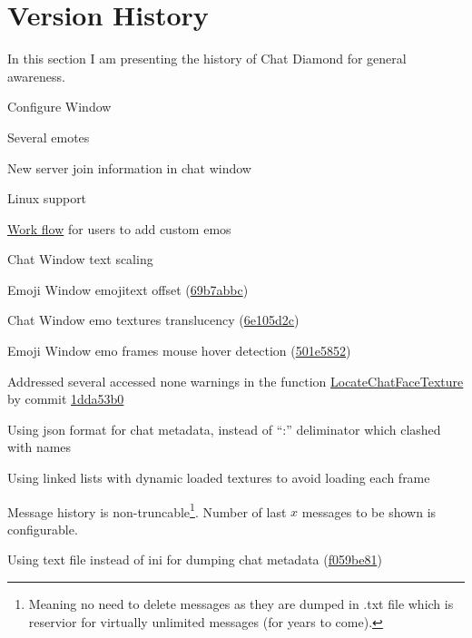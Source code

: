 \documentclass{article}
\theoremstyle{definition}
\begin{document}
\section{Version History}
In this section I am presenting the history of Chat Diamond for general awareness.
\begin{changelog}[author=The\_Cowboy, sectioncmd=\section*]
\begin{version}[v=0.8, date=2023-12-10]
  \added
    \item Configure Window
    \item Several emotes
    \item New server join information in chat window
    \item Linux support
    \item \href{https://github.com/ravimohan1991/ChatDiamond/wiki/Adding-an-Emote-in-Chat-Diamond}{Work flow} for users to add custom emos
  \fixed
    \item Chat Window text scaling
    \item Emoji Window emojitext offset (\href{https://github.com/ravimohan1991/ChatDiamond/commit/69b7abbce0617ae1c2de0660379984852df9c76d}{69b7abbc})
    \item Chat Window emo textures translucency (\href{https://github.com/ravimohan1991/ChatDiamond/commit/6e105d2cce5db1380c27df546e604d0f306eccd4}{6e105d2c})
    \item Emoji Window emo frames mouse hover detection (\href{https://github.com/ravimohan1991/ChatDiamond/commit/501e585250a6553ca95ca9b9d5e0ad25b1e645b5}{501e5852})
    \item Addressed several accessed none warnings in the function \href{https://github.com/ravimohan1991/ChatDiamond/blob/1dda53b01b493a2ef8be156966b3230758211254/Classes/CDUTChatTextTextureAnimEmoteArea.uc#L890}{LocateChatFaceTexture} by commit \href{https://github.com/ravimohan1991/ChatDiamond/commit/1dda53b01b493a2ef8be156966b3230758211254}{1dda53b0}
 \changed
    \item Using json format for chat metadata, instead of ``:'' deliminator which clashed with names
    \item Using linked lists with dynamic loaded textures to avoid loading each frame
    \item Message history is non-truncable\footnote{Meaning no need to delete messages as they are dumped in .txt file which is reservior for virtually unlimited messages (for years to come).}. Number of last $x$ messages to be shown is configurable.
    \item Using text file instead of ini for dumping chat metadata (\href{https://github.com/ravimohan1991/ChatDiamond/commit/f059be817532fa720804bd20f54a36e3c82ddb9d}{f059be81})
\end{version}
\end{changelog}
\end{document}

